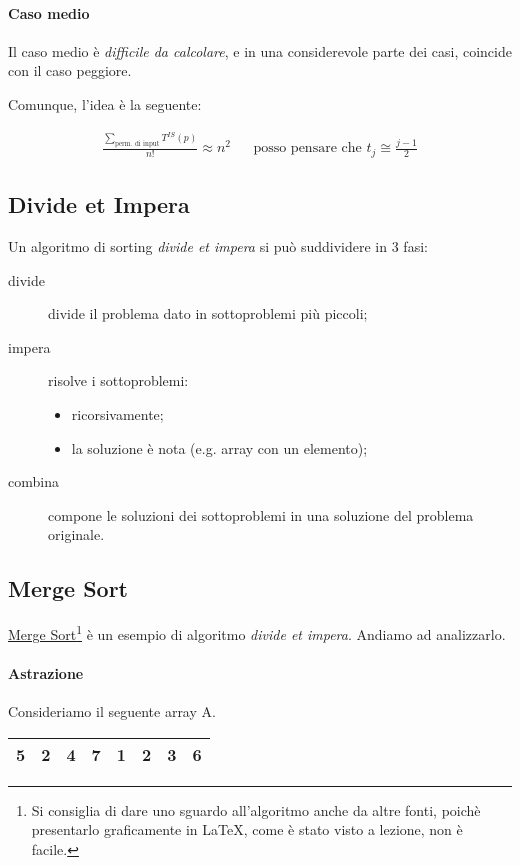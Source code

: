 \paragraph{Caso medio} \label{is:casomedio}
Il caso medio è \emph{difficile da calcolare}, e in una considerevole parte dei casi,
coincide con il caso peggiore.\par
Comunque, l'idea è la seguente:

\begin{align*}
    \frac{\displaystyle\sum_{\text{perm. di input}}T^{IS}(p)}{n!} \approx n^2 && 
        \text{posso pensare che } t_j \cong \frac{j-1}{2}
\end{align*}

\subsection{Divide et Impera}

Un algoritmo di sorting \emph{divide et impera} si può suddividere in 3 fasi:

\begin{description}
    \item[divide] divide il problema dato in sottoproblemi più piccoli;
    \item[impera] risolve i sottoproblemi:
    \begin{itemize}
        \item ricorsivamente;
        \item la soluzione è nota (e.g. array con un elemento);
    \end{itemize}
    \item[combina] compone le soluzioni dei sottoproblemi in una soluzione del 
        problema originale.
\end{description}

\subsection{Merge Sort} \label{mergesort}
\href{https://en.wikipedia.org/wiki/Merge_sort}{Merge Sort}\footnote{Si %
consiglia di dare uno sguardo all'algoritmo anche da altre fonti, poichè presentarlo %
graficamente in \LaTeX, come è stato visto a lezione, non è facile.} è un 
esempio di algoritmo \emph{divide et impera}. Andiamo ad analizzarlo.

\paragraph{Astrazione} Consideriamo il seguente array A.
\begin{center}
	\begin{tabular}{|l|l|l|l||l|l|l|l|}
		\hline
		5 & 2 & 4 & 7 & 1 & 2 & 3 & 6 \\
		\hline
	\end{tabular}
\end{center}

